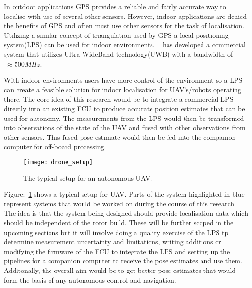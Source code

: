 In outdoor applications GPS provides a reliable and fairly accurate way to localise with use of several other sensors.
    However, indoor applications are denied the benefits of GPS and often must use other sensors for the task of localisation.
    Utilizing a similar concept of triangulation used by GPS a local positioning system(LPS) can be used for indoor environments.
    ~\citep{pozyx2018pozyx} has developed a commercial system that utilizes Ultra-WideBand technology(UWB) with a bandwidth of $~\approx 500MHz$.

    With indoor environments users have more control of the environment so a LPS can create a feasible solution for indoor localisation for UAV's/robots operating there.
    The core idea of this research would be to integrate a commercial LPS directly into an existing FCU to produce accurate position estimates that can be used for autonomy.
    The measurements from the LPS would then be transformed into observations of the state of the UAV and fused with other observations from other sensors.
    This fused pose estimate would then be fed into the companion computer for off-board processing.
    \begin{figure}[h!]
        \centering
        \texttt{[image: drone\_setup]}
        \caption{The typical setup for an autonomous UAV.}
        \label{fig:ds}
    \end{figure}

    Figure:~\ref{fig:ds} shows a typical setup for UAV.
    Parts of the system highlighted in blue represent systems that would be worked on during the course of this research.
    The idea is that the system being designed should provide localisation data which should be independent of the rotor build.
    These will be further scoped in the upcoming sections but it will involve doing a quality exercise of the LPS tp determine measurement uncertainty and limitations,
    writing additions or modifying the firmware of the FCU to integrate the LPS and setting up the pipelines for a companion computer to receive the pose estimates and use them.
    Additonally, the overall aim would be to get better pose estimates that would form the basis of any autonomous control and navigation.



